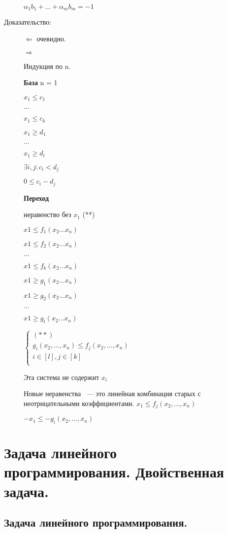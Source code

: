 \documentclass[12pt]{article}
\begin{document}
\begin{description}
\begin{description}
$\alpha_1 b_1 + \ldots + \alpha_m b_m = -1$

\item[Доказательство:]

$\Leftarrow$ очевидно. 

$\Rightarrow$ 

Индукция по n.

{\bf База} n = 1

$x_1 \le c_1$

$\ldots$

$x_1 \le c_k$

$x_1 \ge d_1$

$\ldots$

$x_1 \ge d_l$

$\exists i, j: c_i < d_j$

$0 \le c_i - d_j$

{\bf Переход}

неравенство без $x_1$ (**)

$x1 \le f_1(x_2 \ldots x_n)$

$x1 \le f_2(x_2 \ldots x_n)$

$\ldots$

$x1 \le f_k(x_2 \ldots x_n)$


$x1 \ge g_1(x_2 \ldots x_n)$

$x1 \ge g_2(x_2 \ldots x_n)$

$\ldots$

$x1 \ge g_t(x_2 \ldots x_n)$

$\begin{cases} (**) \\ g_i(x_2, \ldots, x_n) \le f_j(x_2, \ldots, x_n)\\ i \in [l], j \in [k] \\ \end{cases}$

Эта система  не содержит $x_i$

Новые неравенства ~--- это линейная комбинация старых с неотрицательными коэффициентами. 
$x_1 \le f_j(x_2, \ldots, x_n)$

$-x_1 \le -g_i(x_2, \ldots, x_n)$ 
\end{description}

\section{Задача линейного программирования. Двойственная задача.}

\subsection{Задача линейного программирования.}


\end{description}
\end{document}
